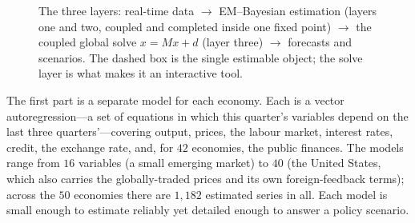 \documentclass[11pt]{article}
\begin{document}
\begin{figure}[t]
\centering
{}
\caption{The three layers: real-time data $\to$ EM--Bayesian estimation (layers one and two, coupled and
completed inside one fixed point) $\to$ the coupled global solve $x=Mx+d$ (layer three) $\to$
forecasts and scenarios. The dashed box is the single estimable object; the solve layer is what makes it
an interactive tool.}
\label{fig:system}
\end{figure}

The first part is a separate model for each economy. Each is a vector autoregression---a set of equations
in which this quarter's variables depend on the last three quarters'---covering output, prices, the
labour market, interest rates, credit, the exchange rate, and, for $42$ economies, the public finances.
The models range from $16$ variables (a small emerging market) to $40$ (the United States, which also
carries the globally-traded prices and its own foreign-feedback terms); across the $50$ economies there
are $1{,}182$ estimated series in all. Each model is small enough to estimate reliably yet detailed
enough to answer a policy scenario.
\end{document}
